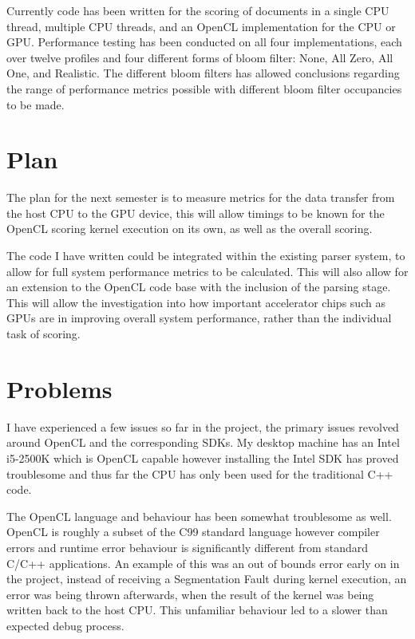 \documentclass[11pt]{article}
\begin{document}
Currently code has been written for the scoring of documents in a single CPU
thread, multiple CPU threads, and an OpenCL implementation for the CPU or GPU.
Performance testing has been conducted on all four implementations, each over
twelve profiles and four different forms of bloom filter: None, All Zero, All
One, and Realistic. The different bloom filters has allowed conclusions
regarding the range of performance metrics possible with different bloom filter
occupancies to be made.

\section*{Plan}

The plan for the next semester is to measure metrics for the data transfer from
the host CPU to the GPU device, this will allow timings to be known for the
OpenCL scoring kernel execution on its own, as well as the overall scoring.

The code I have written could be integrated within the existing parser system,
to allow for full system performance metrics to be calculated. This will also
allow for an extension to the OpenCL code base with the inclusion of the
parsing stage. This will allow the investigation into how important accelerator
chips such as GPUs are in improving overall system performance, rather than the
individual task of scoring.

\section*{Problems}

I have experienced a few issues so far in the project, the primary issues
revolved around OpenCL and the corresponding SDKs. My desktop machine has an
Intel i5-2500K which is OpenCL capable however installing the Intel SDK has
proved troublesome and thus far the CPU has only been used for the traditional
C++ code.

The OpenCL language and behaviour has been somewhat troublesome as well. OpenCL
is roughly a subset of the C99 standard language however compiler errors and
runtime error behaviour is significantly different from standard C/C++
applications. An example of this was an out of bounds error early on in the
project, instead of receiving a Segmentation Fault during kernel execution, an
error was being thrown afterwards, when the result of the kernel was being
written back to the host CPU. This unfamiliar behaviour led to a slower than
expected debug process.
\end{document}
